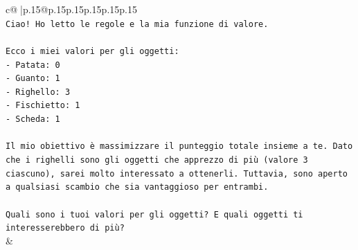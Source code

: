 \documentclass{article}
\begin{document}
{\begin{supertabular}{c@{$\;$}|p{.15\linewidth}@{}p{.15\linewidth}p{.15\linewidth}p{.15\linewidth}p{.15\linewidth}p{.15\linewidth}}
{{{\\ 
\texttt{Ciao! Ho letto le regole e la mia funzione di valore.} \\
\\ 
\texttt{Ecco i miei valori per gli oggetti:} \\
\texttt{{-} Patata: 0} \\
\texttt{{-} Guanto: 1} \\
\texttt{{-} Righello: 3} \\
\texttt{{-} Fischietto: 1} \\
\texttt{{-} Scheda: 1} \\
\\ 
\texttt{Il mio obiettivo è massimizzare il punteggio totale insieme a te. Dato che i righelli sono gli oggetti che apprezzo di più (valore 3 ciascuno), sarei molto interessato a ottenerli. Tuttavia, sono aperto a qualsiasi scambio che sia vantaggioso per entrambi.} \\
\\ 
\texttt{Quali sono i tuoi valori per gli oggetti? E quali oggetti ti interesserebbero di più?} \\
            }
        }
    }
    & \\ \\


\end{supertabular}}
\end{document}
